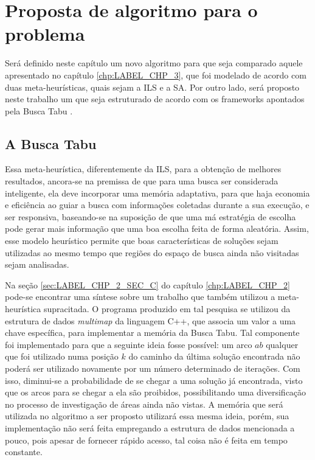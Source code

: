 \chapter{Proposta de algoritmo para o problema}\label{chp:LABEL_CHP_6}

\par Será definido neste capítulo um novo algoritmo para que seja comparado aquele apresentado no capítulo \ref{chp:LABEL_CHP_3}, que foi modelado de acordo com duas meta-heurísticas, quais sejam a ILS e a SA. Por outro lado, será proposto neste trabalho um que seja estruturado de acordo com os frameworks apontados pela Busca Tabu \citep{glover}.

\section{A Busca Tabu}\label{sec:LABEL_CHP_6_SEC_A}

\par Essa meta-heurística, diferentemente da ILS, para a obtenção de melhores resultados, ancora-se na premissa de que para uma busca ser considerada inteligente, ela deve incorporar uma memória adaptativa, para que haja economia e eficiência ao guiar a busca com informações coletadas durante a sua execução, e ser responsiva, baseando-se na suposição de que uma má estratégia de escolha pode gerar mais informação que uma boa escolha feita de forma aleatória. Assim, esse modelo heurístico permite que boas características de soluções sejam utilizadas ao mesmo tempo que regiões do espaço de busca ainda não visitadas sejam analisadas.

\par Na seção \ref{sec:LABEL_CHP_2_SEC_C} do capítulo \ref{chp:LABEL_CHP_2} pode-se encontrar uma síntese sobre um trabalho que também utilizou a meta-heurística supracitada. O programa produzido em tal pesquisa se utilizou da estrutura de dados \textit{multimap} da linguagem C++, que associa um valor a uma chave específica, para implementar a memória da Busca Tabu. Tal componente foi implementado para que a seguinte ideia fosse possível: um arco $ab$ qualquer que foi utilizado numa posição $k$ do caminho da última solução encontrada não poderá ser utilizado novamente por um número determinado de iterações. Com isso, diminui-se a probabilidade de se chegar a uma solução já encontrada, visto que os arcos para se chegar a ela são proibidos, possibilitando uma diversificação no processo de investigação de áreas ainda não vistas. A memória que será utilizada no algoritmo a ser proposto utilizará essa mesma ideia, porém, sua implementação não será feita empregando a estrutura de dados mencionada a pouco, pois apesar de fornecer rápido acesso, tal coisa não é feita em tempo constante.

